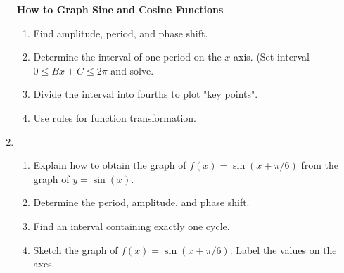 \begin{enumerate}
\vfill
\textbf{How to Graph Sine and Cosine Functions}
\begin{enumerate}
\item Find amplitude, period, and phase shift.
\item Determine the interval of one period on the $x$-axis. (Set interval $0\leq Bx+C \leq 2\pi$ and solve.
\item Divide the interval into fourths to plot "key points".
\item Use rules for function transformation.
\end{enumerate}
\vfill


\newpage

\item \begin{enumerate} \item Explain how to obtain the graph of $f(x)=\sin(x+\pi/6)$ from the graph of $y=\sin(x)$. \\[.75in]

\item Determine the period, amplitude, and phase shift.\\[1.5in]

\item Find an interval containing exactly one cycle.\vfill

\item Sketch the graph of $f(x)=\sin(x+\pi/6)$. Label the values on the axes.

    \noindent

\end{enumerate} 



\end{enumerate}
